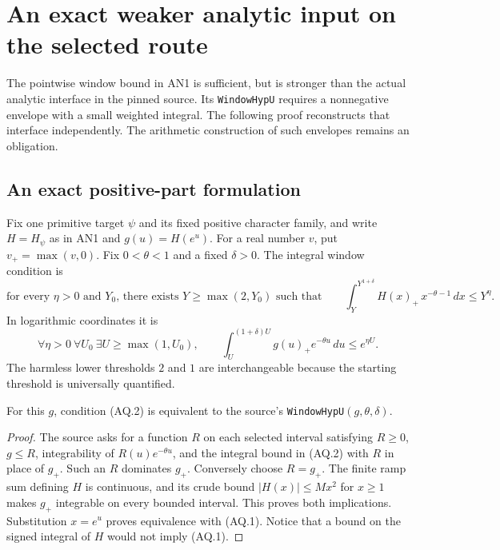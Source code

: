 \section{An exact weaker analytic input on the selected route}
\label{sec:analytic-envelope-audit}

The pointwise window bound in AN1 is sufficient, but is stronger than the
actual analytic interface in the pinned source.  Its
\texttt{WindowHypU} requires a nonnegative envelope with a small weighted
integral.  The following proof reconstructs that interface independently.
The arithmetic construction of such envelopes remains an obligation.

\subsection{An exact positive-part formulation}

Fix one primitive target $\psi$ and its fixed positive character family,
and write $H=H_\psi$ as in AN1 and $g(u)=H(e^u)$.
For a real number $v$, put $v_+=\max(v,0)$.  Fix
$0<\theta<1$ and a fixed $\delta>0$.  The integral window condition is
\[
 \text{for every $\eta>0$ and $Y_0$, there exists
 $Y\ge\max(2,Y_0)$ such that}\qquad
 \int_Y^{Y^{1+\delta}} H(x)_+\,x^{-\theta-1}\,dx\le Y^\eta.
 \tag{AQ.1}
\]
In logarithmic coordinates it is
\[
 \forall\eta>0\ \forall U_0\ \exists U\ge\max(1,U_0),\qquad
 \int_U^{(1+\delta)U}g(u)_+ e^{-\theta u}\,du\le e^{\eta U}.
 \tag{AQ.2}
\]
The harmless lower thresholds $2$ and $1$ are interchangeable because
the starting threshold is universally quantified.

\begin{proposition}
\label{claim:AQ1}
For this $g$, condition (AQ.2) is equivalent to the source's
\texttt{WindowHypU}$(g,\theta,\delta)$.
\end{proposition}
\begin{proof}
The source asks for a function $R$ on each selected interval satisfying
$R\ge0$, $g\le R$, integrability of $R(u)e^{-\theta u}$, and the
integral bound in (AQ.2) with $R$ in place of $g_+$.  Such an $R$
dominates $g_+$.  Conversely choose $R=g_+$.
The finite ramp sum defining $H$ is continuous, and its crude bound
$|H(x)|\le Mx^2$ for $x\ge1$ makes $g_+$ integrable on every bounded
interval.  This proves both implications.  Substitution $x=e^u$
proves equivalence with (AQ.1).  Notice that a bound on the signed
integral of $H$ would not imply (AQ.1).
\end{proof}

